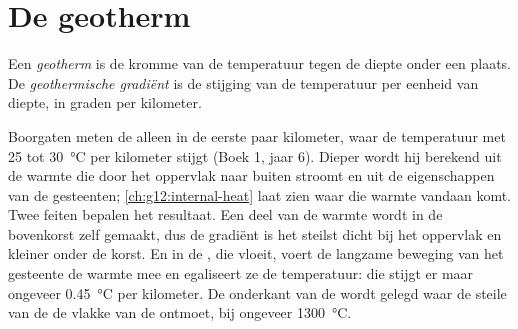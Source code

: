 \section{De geotherm}

\begin{definition}\label{def:g11:lithosphere-asthenosphere:geotherm}
Een \emph{geotherm} is de kromme van de temperatuur tegen de diepte
onder een plaats. De \emph{geothermische gradiënt}
is de stijging van de temperatuur per eenheid van diepte, in graden per kilometer.
\end{definition}

Boorgaten meten de  alleen in de eerste paar kilometer, waar de
temperatuur met 25 tot \qty{30}{\celsius} per kilometer stijgt (Boek 1,
jaar 6). Dieper wordt hij berekend uit de warmte die door het oppervlak naar
buiten stroomt en uit de eigenschappen van de gesteenten;
\cref{ch:g12:internal-heat} laat zien waar die warmte vandaan komt. Twee feiten
bepalen het resultaat. Een deel van de warmte wordt in de bovenkorst zelf
gemaakt, dus de gradiënt is het steilst dicht bij het oppervlak en kleiner onder
de korst. En in de , die vloeit, voert de langzame beweging van het
gesteente de warmte mee en egaliseert ze de temperatuur: die stijgt er maar
ongeveer \qty{0.45}{\celsius} per kilometer. De onderkant van de  wordt
gelegd waar de steile  van de  de vlakke van de 
ontmoet, bij ongeveer \qty{1300}{\celsius}.

